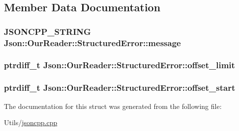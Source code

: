 \subsection{Member Data Documentation}
\hypertarget{structJson_1_1OurReader_1_1StructuredError_a9d0b9986bf765d067dfcf2f971a450d1}{
\subsubsection[{message}]{\setlength{\rightskip}{0pt plus 5cm}J\-S\-O\-N\-C\-P\-P\-\_\-\-S\-T\-R\-I\-N\-G Json\-::\-Our\-Reader\-::\-Structured\-Error\-::message}}\label{structJson_1_1OurReader_1_1StructuredError_a9d0b9986bf765d067dfcf2f971a450d1}
\hypertarget{structJson_1_1OurReader_1_1StructuredError_a15491a751a39c5153af04e68b1d0abb9}{
\subsubsection[{offset\-\_\-limit}]{\setlength{\rightskip}{0pt plus 5cm}ptrdiff\-\_\-t Json\-::\-Our\-Reader\-::\-Structured\-Error\-::offset\-\_\-limit}}\label{structJson_1_1OurReader_1_1StructuredError_a15491a751a39c5153af04e68b1d0abb9}
\hypertarget{structJson_1_1OurReader_1_1StructuredError_a102677698afb8177c985e72dafe72b15}{
\subsubsection[{offset\-\_\-start}]{\setlength{\rightskip}{0pt plus 5cm}ptrdiff\-\_\-t Json\-::\-Our\-Reader\-::\-Structured\-Error\-::offset\-\_\-start}}\label{structJson_1_1OurReader_1_1StructuredError_a102677698afb8177c985e72dafe72b15}


The documentation for this struct was generated from the following file\-:\begin{DoxyCompactItemize}
\item 
Utils/\hyperlink{jsoncpp_8cpp}{jsoncpp.\-cpp}\end{DoxyCompactItemize}
